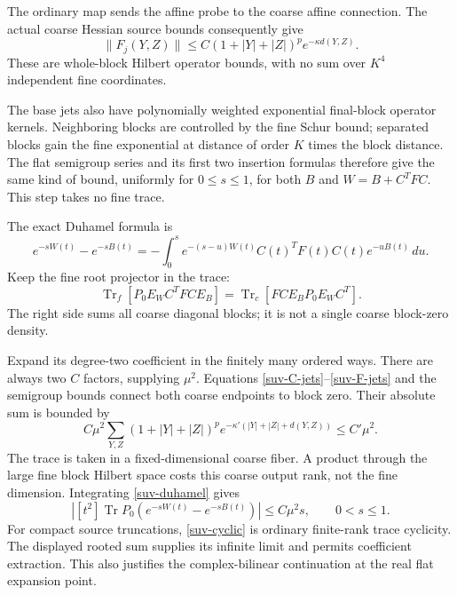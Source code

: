The ordinary map sends the affine probe to the coarse affine
connection. The actual coarse Hessian source bounds consequently give
\begin{equation}
 \|F_j(Y,Z)\|\le C(1+|Y|+|Z|)^p e^{-\kappa d(Y,Z)}.
 \label{suv-F-jets}
\end{equation}
These are whole-block Hilbert operator bounds, with no sum over
$K^4$ independent fine coordinates.

The base jets also have polynomially weighted exponential final-block
operator kernels. Neighboring blocks are controlled by the fine Schur
bound; separated blocks gain the fine exponential at distance of order
$K$ times the block distance. The flat semigroup series and its first
two insertion formulas therefore give the same kind of bound,
uniformly for $0\le s\le1$, for both $B$ and
$W=B+C^TFC$. This step takes no fine trace.

The exact Duhamel formula is
\begin{equation}
 e^{-sW(t)}-e^{-sB(t)}
   =-\int_0^s e^{-(s-u)W(t)}C(t)^TF(t)C(t)e^{-uB(t)}\,du.
 \label{suv-duhamel}
\end{equation}
Keep the fine root projector in the trace:
\begin{equation}
 \operatorname{Tr}_f[P_0 E_W C^TFC E_B]
       =\operatorname{Tr}_c[FC E_B P_0 E_W C^T].
 \label{suv-cyclic}
\end{equation}
The right side sums all coarse diagonal blocks; it is not a single
coarse block-zero density.

Expand its degree-two coefficient in the finitely many ordered ways.
There are always two $C$ factors, supplying $\mu^2$.
Equations \eqref{suv-C-jets}--\eqref{suv-F-jets} and the semigroup
bounds connect both coarse endpoints to block zero. Their absolute
sum is bounded by
\[
 C\mu^2\sum_{Y,Z}(1+|Y|+|Z|)^p
       e^{-\kappa'(|Y|+|Z|+d(Y,Z))}\le C'\mu^2.
\]
The trace is taken in a fixed-dimensional coarse fiber. A product
through the large fine block Hilbert space costs this coarse output
rank, not the fine dimension. Integrating \eqref{suv-duhamel} gives
\begin{equation}
 \left|[t^2]\operatorname{Tr}
       P_0(e^{-sW(t)}-e^{-sB(t)})\right|
          \le C\mu^2s,\qquad 0<s\le1.
 \label{suv-correction-bound}
\end{equation}
For compact source truncations, \eqref{suv-cyclic} is ordinary
finite-rank trace cyclicity. The displayed rooted sum supplies its
infinite limit and permits coefficient extraction. This also justifies
the complex-bilinear continuation at the real flat expansion point.

